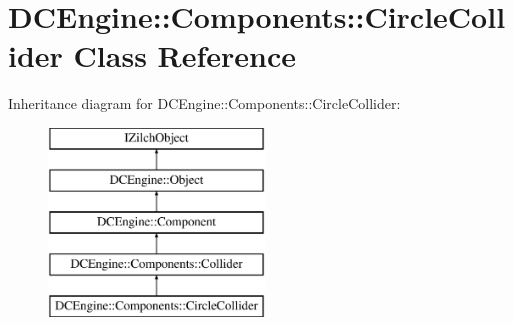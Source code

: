 \hypertarget{classDCEngine_1_1Components_1_1CircleCollider}{\section{D\-C\-Engine\-:\-:Components\-:\-:Circle\-Collider Class Reference}
\label{classDCEngine_1_1Components_1_1CircleCollider}
}
Inheritance diagram for D\-C\-Engine\-:\-:Components\-:\-:Circle\-Collider\-:\begin{figure}[H]
\begin{center}
\leavevmode
\includegraphics[height=5.000000cm]{classDCEngine_1_1Components_1_1CircleCollider}
\end{center}
\end{figure}
